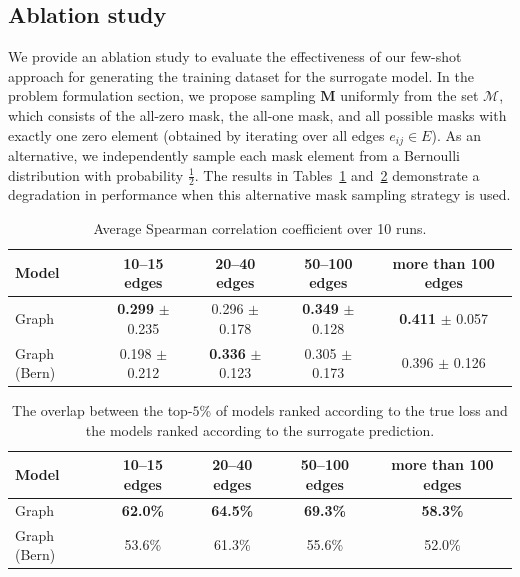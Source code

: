 \documentclass[runningheads]{llncs}
\begin{document}
\subsection{Ablation study}

We provide an ablation study to evaluate the effectiveness of our few-shot approach for generating the training dataset for the surrogate model.
In the problem formulation section, we propose sampling $\mathbf{M}$ uniformly from the set $\mathcal{M}$, which consists of the all-zero mask, the all-one mask, and all possible masks with exactly one zero element (obtained by iterating over all edges $e_{ij} \in E$).
As an alternative, we independently sample each mask element from a Bernoulli distribution with probability $\frac{1}{2}$.
The results in Tables~\ref{results_spearman_ablation} and~\ref{results_top5_ablation} demonstrate a degradation in performance when this alternative mask sampling strategy is used.

\begin{table}[H]
\caption{Average Spearman correlation coefficient over 10 runs.}
\label{results_spearman_ablation}
\centering
\begin{tabular}{|l|c|c|c|c|}
\hline
\bfseries Model & 10--15 edges & 20--40 edges & 50--100 edges & more than 100 edges \\
\hline
Graph  & \textbf{0.299} $\pm$ 0.235 & 0.296 $\pm$ 0.178 & \textbf{0.349} $\pm$ 0.128 & \textbf{0.411} $\pm$ 0.057 \\
Graph (Bern) & 0.198 $\pm$ 0.212 & \textbf{0.336} $\pm$ 0.123 & 0.305 $\pm$ 0.173 & 0.396 $\pm$ 0.126 \\
\hline
\end{tabular}
\end{table}

\begin{table}[H]
\caption{The overlap between the top-$5$\% of models ranked according to the true loss and the models ranked according to the surrogate prediction.}
\label{results_top5_ablation}
\centering
\begin{tabular}{|l|c|c|c|c|}
\hline
\bfseries Model & 10--15 edges & 20--40 edges & 50--100 edges & more than 100 edges \\
\hline
Graph  & \textbf{62.0\%} & \textbf{64.5\%} & \textbf{69.3\%} & \textbf{58.3\%} \\
Graph (Bern) & 53.6\% & 61.3\% & 55.6\% & 52.0\% \\
\hline
\end{tabular}
\end{table}
\end{document}
